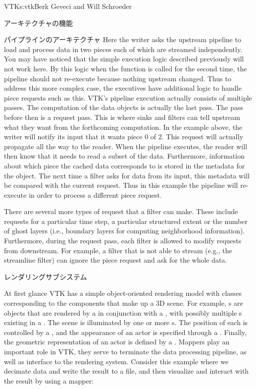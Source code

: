 \begin{aosachapter}{VTK}{s:vtk}{Berk Geveci and Will Schroeder}
\begin{aosasect1}{アーキテクチャの機能}
\begin{aosasect2}{パイプラインのアーキテクチャ}
Here the writer asks the upstream pipeline to load and process data in
two pieces each of which are streamed independently. You may have
noticed that the simple execution logic described previously will not
work here. By this logic when the  function is called for
the second time, the pipeline should not re-execute because nothing
upstream changed. Thus to address this more complex case, the
executives have additional logic to handle piece requests such as
this. VTK's pipeline execution actually consists of multiple
passes. The computation of the data objects is actually the last
pass. The pass before then is a request pass. This is where sinks and
filters can tell upstream what they want from the forthcoming
computation. In the example above, the writer will notify its input
that it wants piece 0 of 2. This request will actually propagate all
the way to the reader. When the pipeline executes, the reader will
then know that it needs to read a subset of the data. Furthermore,
information about which piece the cached data corresponds to is stored
in the metadata for the object. The next time a filter asks for data
from its input, this metadata will be compared with the current
request. Thus in this example the pipeline will re-execute in order to
process a different piece request.

There are several more types of request that a filter can make. These
include requests for a particular time step, a particular structured
extent or the number of ghost layers (i.e., boundary layers for
computing neighborhood information). Furthermore, during the request
pass, each filter is allowed to modify requests from downstream. For
example, a filter that is not able to stream (e.g., the streamline
filter) can ignore the piece request and ask for the whole data.

\end{aosasect2}

\begin{aosasect2}{レンダリングサブシステム}

At first glance VTK has a simple object-oriented rendering model with
classes corresponding to the components that make up a 3D scene. For
example, s are objects that are rendered by a
 in conjunction with a , with
possibly multiple s existing in a
. The scene is illuminated by one or more
s. The position of each  is controlled
by a , and the appearance of an actor is specified
through a . Finally, the geometric representation of
an actor is defined by a . Mappers play an important
role in VTK, they serve to terminate the data processing pipeline, as
well as interface to the rendering system. Consider this example where
we decimate data and write the result to a file, and then visualize
and interact with the result by using a mapper:


\end{aosasect2}
\end{aosasect1}
\end{aosachapter}
